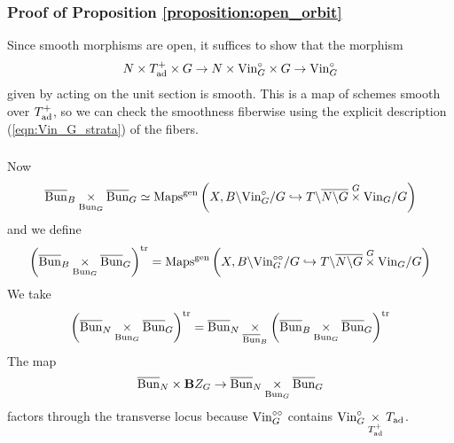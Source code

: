 \subsubsection{Proof of Proposition \ref{proposition:open_orbit}} Since smooth morphisms are open, it suffices to show that the morphism
  \[N \times T_{\mathrm{ad}}^+ \times G \to N \times \mathrm{Vin}_G^\circ \times G \to \mathrm{Vin}_G^\circ\]
given by acting on the unit section is smooth. This is a map of schemes smooth over $T_{\mathrm{ad}}^+$, so we can check the smoothness fiberwise using the explicit description (\ref{eqn:Vin_G_strata}) of the fibers.

\subsubsection{} Now
    \[
    \overline{\mathrm{Bun}}_B \underset{\mathrm{Bun}_G}{\times} \overline{\mathrm{Bun}}_G
    \simeq \mathrm{Maps}^{\mathrm{gen}}\left(X, B \backslash \mathrm{Vin}_G^\circ / G \hookrightarrow T \backslash \overline{N\backslash G} \overset{G}{\times} \mathrm{Vin}_G / G \right)
    \]
and we define
    \[
    \left( \overline{\mathrm{Bun}}_B \underset{\mathrm{Bun}_G}{\times} \overline{\mathrm{Bun}}_G \right)^{\mathrm{tr}}
    = \mathrm{Maps}^{\mathrm{gen}}\left(X, B \backslash \mathrm{Vin}_G^{\circ\circ} / G \hookrightarrow T \backslash \overline{N\backslash G} \overset{G}{\times} \mathrm{Vin}_G / G \right)
    \]
We take
    \[
    \left( \overline{\mathrm{Bun}}_N \underset{\mathrm{Bun}_G}{\times} \overline{\mathrm{Bun}}_G \right)^{\mathrm{tr}}
    = \overline{\mathrm{Bun}}_N \underset{\overline{\mathrm{Bun}}_B}{\times} \left( \overline{\mathrm{Bun}}_B \underset{\mathrm{Bun}_G}{\times} \overline{\mathrm{Bun}}_G \right)^{\mathrm{tr}}
    \]
The map
    \[
    \overline{\mathrm{Bun}}_N \times \mathbf{B} Z_G \to \overline{\mathrm{Bun}}_N \underset{\mathrm{Bun}_G}{\times} \overline{\mathrm{Bun}}_G
    \]
factors through the transverse locus because $\mathrm{Vin}_G^{\circ\circ}$ contains $\mathrm{Vin}_G^\circ \underset{T^+_{\mathrm{ad}}}{\times} T_{\mathrm{ad}}$.

